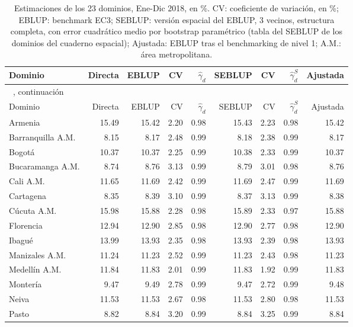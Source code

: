 {\footnotesize\setlength{\tabcolsep}{3pt}
\begin{longtable}{l r r r r r r r r}
\caption[Estimaciones de los dominios]{Estimaciones de los 23 dominios, Ene-Dic 2018, en \%. CV: coeficiente de variación, en \%; EBLUP: benchmark EC3; SEBLUP: versión espacial del EBLUP, 3 vecinos, estructura completa, con error cuadrático medio por bootstrap paramétrico (tabla del SEBLUP de los dominios del cuaderno espacial); Ajustada: EBLUP tras el benchmarking de nivel 1; A.M.: área metropolitana.}
\label{tab:app_dominios_modelo} \\
\toprule
Dominio & Directa & EBLUP & CV & $\hat{\gamma}_d$ & SEBLUP & CV & $\hat{\gamma}^S_d$ & Ajustada \\
\midrule
\endfirsthead
\multicolumn{9}{l}{\tablename~\thetable{}, continuación} \\
\toprule
Dominio & Directa & EBLUP & CV & $\hat{\gamma}_d$ & SEBLUP & CV & $\hat{\gamma}^S_d$ & Ajustada \\
\midrule
\endhead
\bottomrule
\endlastfoot
Armenia & 15.49 & 15.42 & 2.20 & 0.98 & 15.43 & 2.23 & 0.98 & 15.42 \\
Barranquilla A.M. & 8.15 & 8.17 & 2.48 & 0.99 & 8.18 & 2.38 & 0.99 & 8.17 \\
Bogotá & 10.37 & 10.37 & 2.25 & 0.99 & 10.38 & 2.33 & 0.99 & 10.37 \\
Bucaramanga A.M. & 8.74 & 8.76 & 3.13 & 0.99 & 8.79 & 3.01 & 0.98 & 8.76 \\
Cali A.M. & 11.65 & 11.69 & 2.42 & 0.99 & 11.69 & 2.47 & 0.99 & 11.69 \\
Cartagena & 8.35 & 8.39 & 3.10 & 0.99 & 8.37 & 3.13 & 0.99 & 8.38 \\
Cúcuta A.M. & 15.98 & 15.88 & 2.28 & 0.98 & 15.89 & 2.33 & 0.97 & 15.88 \\
Florencia & 12.94 & 12.90 & 2.85 & 0.98 & 12.90 & 2.77 & 0.98 & 12.90 \\
Ibagué & 13.99 & 13.93 & 2.35 & 0.98 & 13.93 & 2.39 & 0.98 & 13.93 \\
Manizales A.M. & 11.24 & 11.23 & 2.52 & 0.99 & 11.23 & 2.43 & 0.98 & 11.23 \\
Medellín A.M. & 11.84 & 11.83 & 2.01 & 0.99 & 11.83 & 1.92 & 0.99 & 11.83 \\
Montería & 9.47 & 9.49 & 2.78 & 0.99 & 9.47 & 2.72 & 0.99 & 9.48 \\
Neiva & 11.53 & 11.53 & 2.67 & 0.98 & 11.53 & 2.80 & 0.98 & 11.53 \\
Pasto & 8.82 & 8.84 & 3.20 & 0.99 & 8.84 & 3.25 & 0.99 & 8.84 \\

\end{longtable}}
